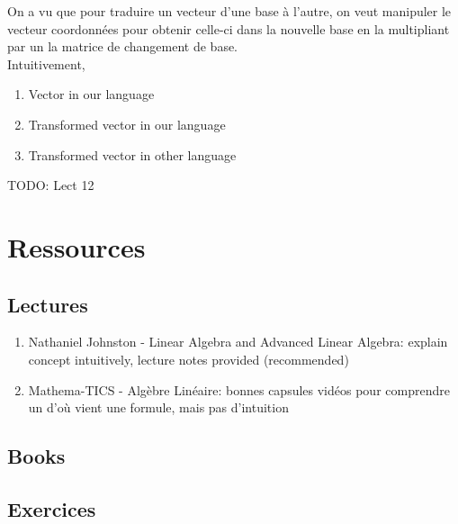 \documentclass{article}
\begin{document}

\begin{intuition}
    On a vu que pour traduire un vecteur d'une base à l'autre, on
    veut manipuler le vecteur coordonnées pour obtenir celle-ci
    dans la nouvelle base en la multipliant par un la matrice de
    changement de base.\\
    Intuitivement,
    \begin{enumerate}
        \item Vector in our language
	\item Transformed vector in our language
	\item Transformed vector in other language
    \end{enumerate}
\end{intuition}


TODO: Lect 12


\section{Ressources}%
\label{sec:Ressources}

\subsection{Lectures}%
\label{sub:Lectures}

\begin{enumerate}
    \item Nathaniel Johnston - Linear Algebra and Advanced Linear Algebra:
	explain concept intuitively, lecture notes provided (recommended)
    \item Mathema-TICS - Algèbre Linéaire: bonnes capsules vidéos pour
	comprendre un d'où vient une formule, mais pas d'intuition
\end{enumerate}

\subsection{Books}%
\label{sub:Books}

\subsection{Exercices}%
\label{sub:Exercices}
\end{document}
